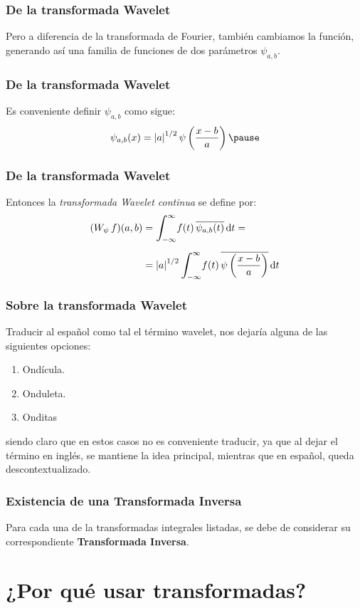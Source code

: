 \documentclass[12pt]{beamer}
\begin{document}
\begin{frame}
\frametitle{De la transformada Wavelet}
Pero a diferencia de la transformada de Fourier, también cambiamos la función, generando así una familia de funciones de dos parámetros $\psi_{a, b}$.
\end{frame}
\begin{frame}
\frametitle{De la transformada Wavelet}
Es conveniente definir $\psi_{a, b}$ como sigue:
\pause
\begin{align*}
\psi_{a, b} (x) = \abs{a}^{1/2} \, \psi \left( \dfrac{x - b}{a} \right)
\pause
\end{align*}
\end{frame}
\begin{frame}
\frametitle{De la transformada Wavelet}
Entonces la \emph{transformada Wavelet continua} se define por:
\pause
\begin{align*}
(W_{\psi} \, f) (a, b) &= \scaleint{6ex}_{\bs -\infty}^{\infty} f (t) \, \overline{\psi_{a, b} (t)} \dd{t} = \\[0.5em]
&= \abs{a}^{1/2} \, \scaleint{6ex}_{\bs -\infty}^{\infty} f (t) \, \overline{\psi \left( \dfrac{x - b}{a} \right)} \dd{t}
\end{align*}
\end{frame}
\begin{frame}
\frametitle{Sobre la transformada Wavelet}
Traducir al español como tal el término wavelet, nos dejaría alguna de las siguientes opciones:
\begin{enumerate}[<+->]
\item Ondícula.
\item Onduleta.
\item Onditas
\end{enumerate}
\pause
siendo claro que en estos casos no es conveniente traducir, ya que al dejar el término en inglés, se mantiene la idea principal, mientras que en español, queda descontextualizado.
\end{frame}
\begin{frame}
\frametitle{Existencia de una Transformada Inversa}
Para cada una de la transformadas integrales listadas, se debe de considerar su correspondiente \textbf{\textcolor{carnelian}{Transformada Inversa}}.
\end{frame}

\section{¿Por qué usar transformadas?}
\end{document}
